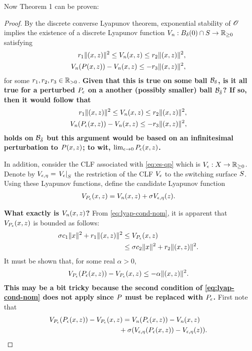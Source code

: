 \documentclass[twocolumn]{article}
\begin{document}
Now Theorem 1 can be proven:
\begin{proof}
  By the discrete converse Lyapunov theorem, exponential stability of $\Orbit$ implies the existence of a discrete Lyapunov function $\Vn : B_{\delta}(0) \cap \S \to \Rnn$ satisfying
  \begin{align}
    \nonumber
    r_{1} \| (\zdx, \zdz) \|^{2} \leq \Vn(\zdx, \zdz) \leq r_{2} \| (\zdx, \zdz) \|^2,\\
    \Vn(\P(\zdx, \zdz)) - \Vn(\zdx, \zdz) \leq -r_{3} \| (\zdx, \zdz) \|^{2},
    \label{eq:lyap-cond-nom}
  \end{align}
  for some $r_{1}, r_{2}, r_{3} \in \Rpd$.
  {\bf Given that this is true on some ball $\B_{\delta}$, is it all true for a perturbed $\Pe$ on a another (possibly smaller) ball $\B_{\bar \delta}$? If so, then it would follow that
  \begin{align}
    \nonumber
    r_{1} \| (\zdx, \zdz) \|^{2} \leq \Vn(\zdx, \zdz) \leq r_{2} \| (\zdx, \zdz) \|^2,\\
    \Vn(\P_{\epsilon}(\zdx, \zdz)) - \Vn(\zdx, \zdz) \leq -r_{3} \| (\zdx, \zdz) \|^{2},
    \label{eq:lyap-cond-nom}
  \end{align}
  holds on $\B_{\bar \delta}$ but this argument would be based on an infinitesimal perturbation to $P(\zdx, \zdz)$; to wit, $\limeps \Pe(\zdx, \zdz)$.}

  In addition, consider the CLF associated with \eqref{eq:es-qp} which is $\Ve : \zdX \to \Rnn$.
  Denote by $\Vee = \VeS$ the restriction of the CLF $\Ve$ to the switching surface $\S$.
  Using these Lyapunov functions, define the candidate Lyapunov function
  \begin{align}
    \VP(\zdx, \zdz) = \Vn(\zdx, \zdz) + \sigma \Vee(\zdz).
  \end{align}

  {\bf What exactly is $\Vn(\zdx, \zdz)$?}
  From \eqref{eq:lyap-cond-nom}, it is apparent that $\VP(\zdx, \zdz)$ is bounded as follows:
  \begin{align}
    \sigma c_{1} \| \zdx \|^{2} + r_{1} \| (\zdx, \zdz) \|^{2} &\leq \VP(\zdx, \zdz)\\
    \nonumber
    &\leq \sigma c_{2} \| \zdx \|^{2} + r_{2} \| (\zdx, \zdz) \|^{2}.
  \end{align}
  It must be shown that, for some real $\alpha > 0$,
  \begin{align}
    \VP(\Pe(\zdx, \zdz)) - \VP(\zdx, \zdz) \leq -\alpha \| (\zdx, \zdz) \|^{2}.
  \end{align}
      {\bf This may be a bit tricky because the second condition of \eqref{eq:lyap-cond-nom} does not apply since $\P$ must be replaced with $\Pe$.}
  First note that
  \begin{align}
    \lefteqn{\VP(\Pe(\zdx, \zdz)) - \VP(\zdx, \zdz) = \Vn(\Pe(\zdx, \zdz)) - \Vn(\zdx, \zdz)}\\
    \nonumber
    &&\hspace{3.2cm}\mbox{} + \sigma(\Vee(\Pe(\zdx, \zdz)) - \Vee(\zdz)).
  \end{align}


\end{proof}
\end{document}
